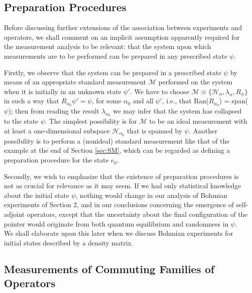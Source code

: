 \documentclass[12pt]{article}
\newcommand{\sa}{self-adjoint}
\renewcommand{\a}{\alpha}
\newcommand{\la}{\lambda_{\a}}
\newcommand{\Ha}{{\H}_{\a}}
\renewcommand{\H}{\mbox{$\mathcal{H}$}}
\newcommand{\Aa}{R_{\a}}
\newcommand{\M}{\mbox{$\mathcal{M}$}}
\begin{document}
\subsection{Preparation Procedures}
\label{sec:PP}
Before discussing further extensions of the association between
experiments and operators, we shall comment on an implicit assumption
apparently required for the measurement analysis to be relevant: that
the system upon which measurements are to be performed can be prepared
in any prescribed state $\psi$.

Firstly, we observe that the system can be prepared in a prescribed
state $\psi$ by means of an appropriate standard measurement \M{}
performed on the system when it is initially in an unknown state
$\psi'$.  We have to choose $\M\equiv \{\Ha, \la, \Aa \}$ in such a
way that $R_{\a_{0}}\psi'=\psi$, for some $\a_{0}$ and all $\psi'$,
i.e., that Ran($R_{\a_{0}}$) = span($\psi$); then {}from reading the
result $\lambda_{\a_0}$ we may infer that the system has collapsed to
the state $\psi$.  The simplest possibility is for $\M$ to be an ideal
measurement with at least a one-dimensional subspace $\H_{\a_{0}}$
that is spanned by $\psi$.  Another possibility is to perform a
(nonideal) standard measurement like that of the example at the end of
Section \ref{sec:SM}, which can be regarded as defining a preparation
procedure for the state $e_{0}$.

Secondly, we wish to emphasize that the existence of preparation
procedures is not as crucial for relevance as it may seem.  If we had
only statistical knowledge about the initial state $\psi$, nothing
would change in our analysis of Bohmian experiments of Section 2, and
in our conclusions concerning the emergence of \sa{} operators, except
that the uncertainty about the final configuration of the pointer
would originate {}from both quantum equilibrium and randomness in
$\psi$. We shall elaborate upon this later when we discuss Bohmian
experiments for initial states described by a density matrix.

\subsection{Measurements of Commuting Families of Operators}
\label{secMCFO}
\end{document}
